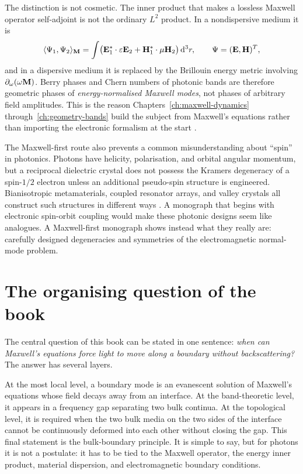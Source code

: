 The distinction is not cosmetic.  The inner product that makes a
lossless Maxwell operator self-adjoint is not the ordinary
$L^2$ product.  In a nondispersive medium it is
\begin{equation}\label{eq:ch1-energy-product-preview}
  \langle \Psi_1,\Psi_2\rangle_{\mathbf{M}}
  = \int \bigl(\mathbf{E}_1^*\cdot\varepsilon\mathbf{E}_2
       + \mathbf{H}_1^*\cdot\mu\mathbf{H}_2\bigr)\,\mathrm{d}^3 r,
  \qquad \Psi=(\mathbf{E},\mathbf{H})^T,
\end{equation}
and in a dispersive medium it is replaced by the Brillouin energy
metric involving $\partial_\omega(\omega\mathbf{M})$.  Berry phases and
Chern numbers of photonic bands are therefore geometric phases of
\emph{energy-normalised Maxwell modes}, not phases of arbitrary field
amplitudes.  This is the reason Chapters~\ref{ch:maxwell-dynamics}
through~\ref{ch:geometry-bands} build the subject from Maxwell's
equations rather than importing the electronic formalism at the start
\cite{gangaraj2016berry,silveirinha2016bulk,haldane2008possible}.

The Maxwell-first route also prevents a common misunderstanding about
``spin'' in photonics.  Photons have helicity, polarisation, and
orbital angular momentum, but a reciprocal dielectric crystal does not
possess the Kramers degeneracy of a spin-$1/2$ electron unless an
additional pseudo-spin structure is engineered.  Bianisotropic
metamaterials, coupled resonator arrays, and valley crystals all
construct such structures in different ways
\cite{khanikaev2013photonic,hafezi2013imaging,mit2026pdf}.  A monograph
that begins with electronic spin-orbit coupling would make these
photonic designs seem like analogues.  A Maxwell-first monograph shows
instead what they really are: carefully designed degeneracies and
symmetries of the electromagnetic normal-mode problem.

\section{The organising question of the book}
\label{sec:ch1-organising-question}

The central question of this book can be stated in one sentence:
\emph{when can Maxwell's equations force light to move along a boundary
without backscattering?}  The answer has several layers.

At the most local level, a boundary mode is an evanescent solution of
Maxwell's equations whose field decays away from an interface.  At the
band-theoretic level, it appears in a frequency gap separating two
bulk continua.  At the topological level, it is required when the two
bulk media on the two sides of the interface cannot be continuously
deformed into each other without closing the gap.  This final statement
is the bulk-boundary principle.  It is simple to say, but for photons it
is not a postulate: it has to be tied to the Maxwell operator, the
energy inner product, material dispersion, and electromagnetic boundary
conditions.

